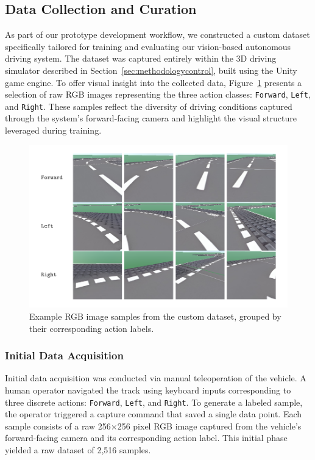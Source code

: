  

\subsection{Data Collection and Curation}
\label{sec:data_collection}

As part of our prototype development workflow, we constructed a custom dataset specifically tailored for training and evaluating our vision-based autonomous driving system. The dataset was captured entirely within the 3D driving simulator described in Section~\ref{sec:methodologycontrol}, built using the Unity game engine. To offer visual insight into the collected data, Figure~\ref{fig:dataset-samples} presents a selection of raw RGB images representing the three action classes: \texttt{Forward}, \texttt{Left}, and \texttt{Right}. These samples reflect the diversity of driving conditions captured through the system's forward-facing camera and highlight the visual structure leveraged during training.
 \begin{figure}[h]
 \centering
 \includegraphics[width=0.95\linewidth]{figures/samples.pdf}
 \caption{Example RGB image samples from the custom dataset, grouped by their corresponding action labels.}
 \label{fig:dataset-samples}
 \end{figure}
\subsubsection{Initial Data Acquisition}
Initial data acquisition was conducted via manual teleoperation of the vehicle. A human operator navigated the track using keyboard inputs corresponding to three discrete actions: \texttt{Forward}, \texttt{Left}, and \texttt{Right}. To generate a labeled sample, the operator triggered a capture command that saved a single data point. Each sample consists of a raw 256$\times$256 pixel RGB image captured from the vehicle's forward-facing camera and its corresponding action label. This initial phase yielded a raw dataset of  2,516 samples.

